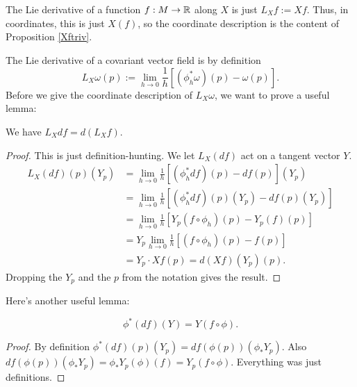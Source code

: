 \documentclass[11pt, english]{article}
\begin{document}
The Lie derivative of a function $f:M \to \mathbb{R}$ along $X$ is just $L_Xf := Xf$. Thus, in coordinates, this is just $X(f)$, so the coordinate description is the content of Proposition \ref{Xftriv}.

The Lie derivative of a covariant vector field is by definition
\[
L_X\omega(p) := \lim_{h \to 0} \frac 1h \left[ (\phi_h^\ast \omega)(p) - \omega(p) \right].
\]
Before we give the coordinate description of $L_X \omega$, we want to prove a useful lemma:
\begin{lemma}
\label{lxdf}
We have $L_X df = d(L_Xf)$.
\end{lemma}
\begin{proof}
This is just definition-hunting. We let $L_X(df)$ act on a tangent vector $Y$.
\begin{align*}
L_X (df)(p)(Y_p) &= \lim_{h \to 0} \frac 1h \left[ (\phi_h^\ast df)(p) - df(p) \right](Y_p) \\
&= \lim_{h \to 0} \frac 1h \left[ (\phi_h^\ast df)(p)(Y_p) - df(p)(Y_p) \right] \\
&= \lim_{h \to 0} \frac 1h \left[ Y_p(f \circ \phi_h)(p)-Y_p(f)(p) \right] \\
&= Y_p \lim_{h \to 0} \frac 1h \left[ (f \circ \phi_h)(p)-f(p) \right] \\
&= Y_p \cdot  Xf(p) = d(Xf)(Y_p)(p).
\end{align*}
Dropping the $Y_p$ and the $p$ from the notation gives the result.
\end{proof}

Here's another useful lemma:
\begin{lemma}
\[
\phi^\ast(df)(Y) = Y(f \circ \phi).
\]
\end{lemma}
\begin{proof}
By definition $\phi^\ast(df)(p)(Y_p) = df(\phi(p))(\phi_\ast Y_p)$. Also $df(\phi(p))(\phi_\ast Y_p)=\phi_\ast Y_p(\phi)(f)=Y_p(f \circ \phi)$. Everything was just definitions.
\end{proof}
\end{document}
